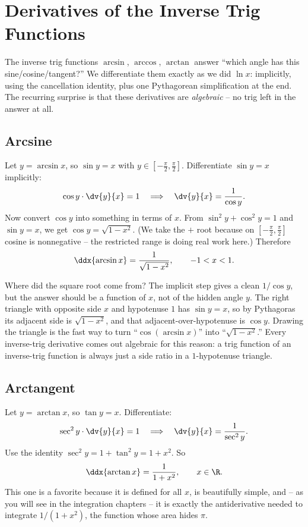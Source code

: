 \section{Derivatives of the Inverse Trig Functions}
\label{ch12:inverse-trig}

The inverse trig functions $\arcsin$, $\arccos$, $\arctan$ answer ``which
angle has this sine/cosine/tangent?'' We differentiate them exactly as we
did $\ln x$: implicitly, using the cancellation identity, plus one
Pythagorean simplification at the end. The recurring surprise is that these
derivatives are \emph{algebraic} -- no trig left in the answer at all.

\subsection{Arcsine}

Let $y = \arcsin x$, so $\sin y = x$ with $y\in[-\tfrac\pi2,\tfrac\pi2]$.
Differentiate $\sin y = x$ implicitly:
\[
   \cos y\cdot\dv{y}{x} = 1
   \quad\Longrightarrow\quad
   \dv{y}{x} = \frac{1}{\cos y}.
\]
Now convert $\cos y$ into something in terms of $x$. From
$\sin^2 y + \cos^2 y = 1$ and $\sin y = x$, we get
$\cos y = \sqrt{1-x^2}$. (We take the $+$ root because on
$[-\tfrac\pi2,\tfrac\pi2]$ cosine is nonnegative -- the restricted range is
doing real work here.) Therefore
\[
   \ddx{\arcsin x} = \frac{1}{\sqrt{1-x^2}},\qquad -1<x<1.
\]

\begin{whybox}
Where did the square root come from? The implicit step gives a clean
$1/\cos y$, but the answer should be a function of $x$, not of the hidden
angle $y$. The right triangle with opposite side $x$ and hypotenuse $1$ has
$\sin y = x$, so by Pythagoras its adjacent side is $\sqrt{1-x^2}$, and that
adjacent-over-hypotenuse is $\cos y$. Drawing the triangle is the fast way
to turn ``$\cos(\arcsin x)$'' into ``$\sqrt{1-x^2}$.'' Every inverse-trig
derivative comes out algebraic for this reason: a trig function of an
inverse-trig function is always just a side ratio in a $1$-hypotenuse
triangle.
\end{whybox}

\subsection{Arctangent}

Let $y=\arctan x$, so $\tan y = x$. Differentiate:
\[
   \sec^2 y\cdot\dv{y}{x} = 1
   \quad\Longrightarrow\quad
   \dv{y}{x} = \frac{1}{\sec^2 y}.
\]
Use the identity $\sec^2 y = 1 + \tan^2 y = 1 + x^2$. So
\[
   \ddx{\arctan x} = \frac{1}{1+x^2},\qquad x\in\R.
\]
This one is a favorite because it is defined for all $x$, is beautifully
simple, and -- as you will see in the integration chapters -- it is exactly
the antiderivative needed to integrate $1/(1+x^2)$, the function whose area
hides $\pi$.


